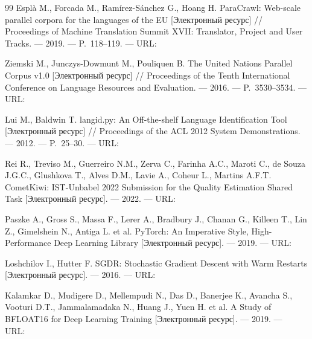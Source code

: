 \begin{thebibliography}{99}
	Esplà M., Forcada M., Ramírez-Sánchez G., Hoang H.
	ParaCrawl: Web-scale parallel corpora for the languages of the EU [Электронный ресурс] // Proceedings of Machine Translation Summit XVII: Translator, Project and User Tracks. — 2019. — P.~118--119. — URL:~

	Ziemski M., Junczys-Dowmunt M., Pouliquen B.
	The United Nations Parallel Corpus v1.0 [Электронный ресурс] // Proceedings of the Tenth International Conference on Language Resources and Evaluation. — 2016. — P.~3530--3534. — URL:~

	Lui M., Baldwin T.
	langid.py: An Off-the-shelf Language Identification Tool [Электронный ресурс] // Proceedings of the ACL 2012 System Demonstrations. — 2012. — P.~25--30. — URL:~

	Rei R., Treviso M., Guerreiro N.M., Zerva C., Farinha A.C., Maroti C., de Souza J.G.C., Glushkova T., Alves D.M., Lavie A., Coheur L., Martins A.F.T.
	CometKiwi: IST-Unbabel 2022 Submission for the Quality Estimation Shared Task [Электронный ресурс]. — 2022. — URL:~

	Paszke A., Gross S., Massa F., Lerer A., Bradbury J., Chanan G., Killeen T., Lin Z., Gimelshein N., Antiga L. et al.
	PyTorch: An Imperative Style, High-Performance Deep Learning Library [Электронный ресурс]. — 2019. — URL:~

	Loshchilov I., Hutter F.
	SGDR: Stochastic Gradient Descent with Warm Restarts [Электронный ресурс]. — 2016. — URL:~

	Kalamkar D., Mudigere D., Mellempudi N., Das D., Banerjee K., Avancha S., Vooturi D.T., Jammalamadaka N., Huang J., Yuen H. et al.
	A Study of BFLOAT16 for Deep Learning Training [Электронный ресурс]. — 2019. — URL:~

\end{thebibliography}
